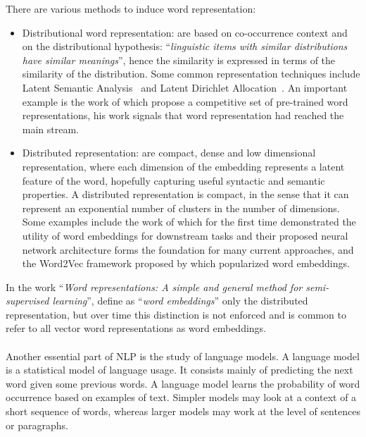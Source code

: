 There are various methods to induce word representation:

\begin{itemize}[itemsep = 0.1em]
\item Distributional word representation: are based on co-occurrence context and on the distributional hypothesis:  ``\textit{linguistic items with similar distributions have similar meanings}'', hence the similarity is expressed in terms of the similarity of the distribution. Some common representation techniques include Latent Semantic Analysis~\citep{deerwester1990indexing} and Latent Dirichlet Allocation~\citep{bei2003lda, das-etal-2015-gaussian}. An important example is the work of \citet{pennington2014glove} which propose a competitive set of pre-trained word representations, his work signals that word representation had reached the main stream.

\item Distributed representation: are compact, dense and low dimensional representation, where each dimension of the embedding represents a latent feature of the word, hopefully capturing useful syntactic and semantic properties. A distributed representation is compact, in the sense that it can represent an exponential number of clusters in the number of dimensions. Some examples include the work of \citet{Collobert2008} which for the first time demonstrated the utility of word embeddings for downstream tasks and their proposed neural network architecture forms the foundation for many current approaches, and the Word2Vec framework proposed by \citet{mikolov2013distributed} which popularized word embeddings.
\end{itemize}

In the work ``\textit{Word representations: A simple and general method for semi-supervised learning}'', \citet{turian2010word} define as ``\textit{word embeddings}'' only the distributed representation, but over time this distinction is not enforced and is common to refer to all vector word representations as word embeddings.


\paragraph{}
Another essential part of NLP is the study of language models. A language model is a statistical model of language usage. It consists mainly of predicting the next word given some previous words. A language model learns the probability of word occurrence based on examples of text. Simpler models may look at a context of a short sequence of words, whereas larger models may work at the level of sentences or paragraphs.

